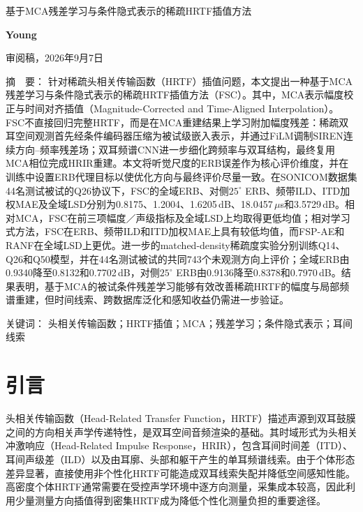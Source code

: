 \documentclass[UTF8,a4paper]{article}
\newenvironment{csmtAbstract}{\par\noindent\kaishu\small{\heiti 摘~~要：}}{\par}
\newenvironment{keywords}{\par\smallskip\noindent\songti\small{\heiti 关键词：}}{\par}
\begin{document}
\begin{center}
{\heiti{}基于MCA残差学习与条件隐式表示的稀疏HRTF插值方法\par}
\vspace{1em}
{\kaishu{}\textbf{Young}\par}
\vspace{0.6em}
{\small 审阅稿，2026年9月7日\par}
\end{center}

\begin{csmtAbstract}
针对稀疏头相关传输函数（HRTF）插值问题，本文提出一种基于MCA残差学习与条件隐式表示的稀疏HRTF插值方法（FSC）。其中，MCA表示幅度校正与时间对齐插值（Magnitude-Corrected and Time-Aligned Interpolation）。FSC不直接回归完整HRTF，而是在MCA重建结果上学习附加幅度残差：稀疏双耳空间观测首先经条件编码器压缩为被试级嵌入表示，并通过FiLM调制SIREN连续方向--频率残差场；双耳频谱CNN进一步细化跨频率与双耳结构，最终复用MCA相位完成HRIR重建。本文将听觉尺度的ERB误差作为核心评价维度，并在训练中设置ERB代理目标以使优化方向与最终评价尽量一致。在SONICOM数据集44名测试被试的Q26协议下，FSC的全域ERB、对侧$25^\circ$ ERB、频带ILD、ITD加权MAE及全域LSD分别为0.8175、1.2004、1.6205\,dB、18.0457\,$\mu$s和3.5729\,dB。相对MCA，FSC在前三项幅度／声级指标及全域LSD上均取得更低均值；相对学习式方法，FSC在ERB、频带ILD和ITD加权MAE上具有较低均值，而FSP-AE和RANF在全域LSD上更优。进一步的matched-density稀疏度实验分别训练Q14、Q26和Q50模型，并在44名测试被试的共同743个未观测方向上评价；全域ERB由0.9340降至0.8132和0.7702\,dB，对侧$25^\circ$ ERB由0.9136降至0.8378和0.7970\,dB。结果表明，基于MCA的被试条件残差学习能够有效改善稀疏HRTF的幅度与局部频谱重建，但时间线索、跨数据库泛化和感知收益仍需进一步验证。
\end{csmtAbstract}

\begin{keywords}
头相关传输函数；HRTF插值；MCA；残差学习；条件隐式表示；耳间线索
\end{keywords}

\section{引言}
\label{sec:introduction}

头相关传输函数（Head-Related Transfer Function，HRTF）描述声源到双耳鼓膜之间的方向相关声学传递特性，是双耳空间音频渲染的基础。其时域形式为头相关冲激响应（Head-Related Impulse Response，HRIR），包含耳间时间差（ITD）、耳间声级差（ILD）以及由耳廓、头部和躯干产生的单耳频谱线索\cite{R6}。由于个体形态差异显著，直接使用非个性化HRTF可能造成双耳线索失配并降低空间感知性能。高密度个体HRTF通常需要在受控声学环境中逐方向测量，采集成本较高，因此利用少量测量方向插值得到密集HRTF成为降低个性化测量负担的重要途径\cite{R13}。
\end{document}

